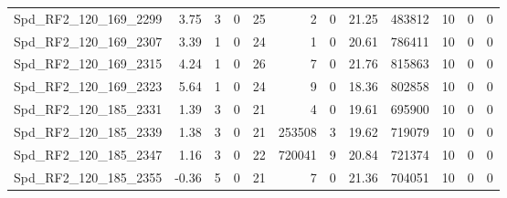 \begin{longtable}[c]{@{}lrrrrrrrrrrr@{}}
Spd\_RF2\_120\_169\_2299      & 3.75                   & 3                       & 0                       & 25                     & 2                       & 0                       & 21.25                   & 483812                   & 10                       & 0                        & 0                        \\
Spd\_RF2\_120\_169\_2307      & 3.39                   & 1                       & 0                       & 24                     & 1                       & 0                       & 20.61                   & 786411                   & 10                       & 0                        & 0                        \\
Spd\_RF2\_120\_169\_2315      & 4.24                   & 1                       & 0                       & 26                     & 7                       & 0                       & 21.76                   & 815863                   & 10                       & 0                        & 0                        \\
Spd\_RF2\_120\_169\_2323      & 5.64                   & 1                       & 0                       & 24                     & 9                       & 0                       & 18.36                   & 802858                   & 10                       & 0                        & 0                        \\
Spd\_RF2\_120\_185\_2331      & 1.39                   & 3                       & 0                       & 21                     & 4                       & 0                       & 19.61                   & 695900                   & 10                       & 0                        & 0                        \\
Spd\_RF2\_120\_185\_2339      & 1.38                   & 3                       & 0                       & 21                     & 253508                  & 3                       & 19.62                   & 719079                   & 10                       & 0                        & 0                        \\
Spd\_RF2\_120\_185\_2347      & 1.16                   & 3                       & 0                       & 22                     & 720041                  & 9                       & 20.84                   & 721374                   & 10                       & 0                        & 0                        \\
Spd\_RF2\_120\_185\_2355      & -0.36                  & 5                       & 0                       & 21                     & 7                       & 0                       & 21.36                   & 704051                   & 10                       & 0                        & 0                        \\

\end{longtable}
